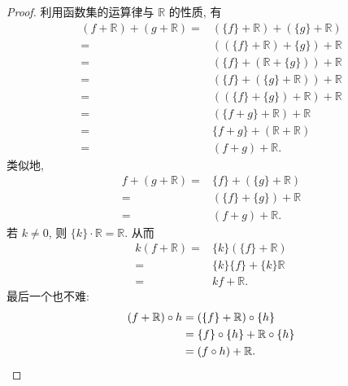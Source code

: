 \begin{proof}
    利用函数集的运算律与 $\mathbb{R}$ 的性质, 有
    \begin{align*}
        (f + \mathbb{R}) + (g + \mathbb{R})
        = {} & (\{ f \} + \mathbb{R}) + (\{ g \} + \mathbb{R}) \\
        = {} & ((\{ f \} + \mathbb{R}) + \{ g \}) + \mathbb{R} \\
        = {} & (\{ f \} + (\mathbb{R} + \{ g \})) + \mathbb{R} \\
        = {} & (\{ f \} + (\{ g \} + \mathbb{R})) + \mathbb{R} \\
        = {} & ((\{ f \} + \{ g \}) + \mathbb{R}) + \mathbb{R} \\
        = {} & (\{ f + g \} + \mathbb{R}) + \mathbb{R}         \\
        = {} & \{ f + g \} + (\mathbb{R} + \mathbb{R})         \\
        = {} & (f + g) + \mathbb{R}.
    \end{align*}
    类似地,
    \begin{align*}
        f + (g + \mathbb{R})
        = {} & \{ f \} + (\{ g \} + \mathbb{R}) \\
        = {} & (\{ f \} + \{ g \}) + \mathbb{R} \\
        = {} & (f + g) + \mathbb{R}.
    \end{align*}
    若 $k \neq 0$, 则 $\{ k \} \cdot \mathbb{R} = \mathbb{R}$. 从而
    \begin{align*}
        k(f + \mathbb{R})
        = {} & \{ k \} ( \{ f \} + \mathbb{R} )     \\
        = {} & \{ k \} \{ f \} + \{ k \} \mathbb{R} \\
        = {} & kf + \mathbb{R}.
    \end{align*}
    最后一个也不难:
    \begin{align*}
        (f + \mathbb{R}) \circ h
        = {} & (\{ f \} + \mathbb{R}) \circ \{ h \}             \\
        = {} & \{ f \} \circ \{ h \} + \mathbb{R} \circ \{ h \} \\
        = {} & ( f \circ h ) + \mathbb{R}. \qedhere
    \end{align*}
\end{proof}
